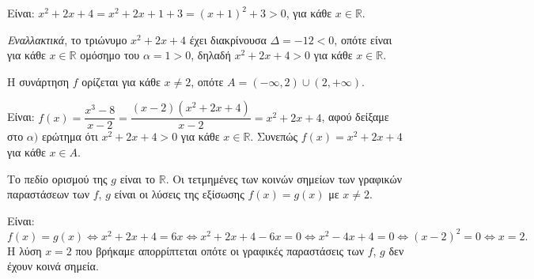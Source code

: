 
\begin{alist}
\item Είναι: $x^2 + 2x + 4 = x^2 + 2x + 1 + 3 = (x + 1)^2 + 3 > 0$, για κάθε $x \in \mathbb{R}$.

\textit{Εναλλακτικά}, το τριώνυμο $x^2 + 2x + 4$ έχει διακρίνουσα $\Delta = -12 < 0$, οπότε είναι για κάθε
$x \in \mathbb{R}$ ομόσημο του $\alpha = 1 > 0$, δηλαδή $x^2 + 2x + 4 > 0$ για κάθε $x \in \mathbb{R}$.
\item Η συνάρτηση $f$ ορίζεται για κάθε $x \neq 2$, οπότε $A = (-\infty, 2) \cup (2, +\infty)$.
\item Είναι: $f(x) = \dfrac{x^3 - 8}{x - 2} = \dfrac{(x - 2)(x^2 + 2x + 4)}{x - 2} = x^2 + 2x + 4$, αφού δείξαμε στο $\alpha)$
ερώτημα ότι $x^2 + 2x + 4 > 0$ για κάθε $x \in \mathbb{R}$. Συνεπώς $f(x) = x^2 + 2x + 4$ για κάθε $x \in A$.
\item Το πεδίο ορισμού της $g$ είναι το $\mathbb{R}$. Οι τετμημένες των κοινών σημείων των γραφικών
παραστάσεων των $f$, $g$ είναι οι λύσεις της εξίσωσης $f(x) = g(x)$ με $x \neq 2$.

Είναι:
\[f(x) = g(x) \Leftrightarrow x^2 + 2x + 4 = 6x \Leftrightarrow x^2 + 2x + 4 - 6x = 0 \Leftrightarrow x^2 - 4x + 4 = 0 \Leftrightarrow (x - 2)^2 = 0 \Leftrightarrow x = 2.\]
Η λύση $x = 2$ που βρήκαμε απορρίπτεται οπότε οι γραφικές παραστάσεις των $f$, $g$ δεν έχουν
κοινά σημεία.
\end{alist}

